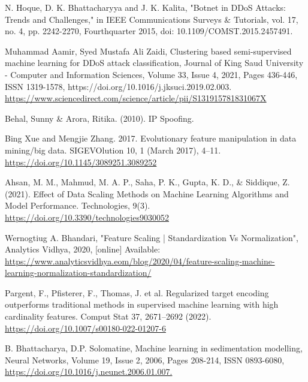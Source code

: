 \documentclass[runningheads]{llncs}
\begin{document}
\begin{thebibliography}{8}

N. Hoque, D. K. Bhattacharyya and J. K. Kalita, "Botnet in DDoS Attacks: Trends and Challenges," 
in IEEE Communications Surveys \& Tutorials, vol. 17, no. 4, pp. 2242-2270, Fourthquarter 2015, 
doi: 10.1109/COMST.2015.2457491.


Muhammad Aamir, Syed Mustafa Ali Zaidi,
Clustering based semi-supervised machine learning for DDoS attack classification,
Journal of King Saud University - Computer and Information Sciences,
Volume 33, Issue 4,
2021,
Pages 436-446,
ISSN 1319-1578,
https://doi.org/10.1016/j.jksuci.2019.02.003.
\url{https://www.sciencedirect.com/science/article/pii/S131915781831067X}

Behal, Sunny \& Arora, Ritika. (2010). IP Spoofing.

Bing Xue and Mengjie Zhang. 2017. Evolutionary feature manipulation in data mining/big data. SIGEVOlution 10, 1 (March 2017), 4–11. \url{https://doi.org/10.1145/3089251.3089252}

Ahsan, M. M., Mahmud, M. A. P., Saha, P. K., Gupta, K. D., \& Siddique, Z. (2021). Effect of Data Scaling Methods on Machine Learning Algorithms and Model Performance. Technologies, 9(3). \url{https://doi.org/10.3390/technologies9030052}

Wernogtiug A. Bhandari, "Feature Scaling | Standardization Vs Normalization", Analytics Vidhya, 2020, [online] Available: \url{https://www.analyticsvidhya.eom/blog/2020/04/feature-scaling-machine-learning-normalization-standardization/}

Pargent, F., Pfisterer, F., Thomas, J. et al. Regularized target encoding outperforms traditional methods in supervised machine learning with high cardinality features. Comput Stat 37, 2671–2692 (2022). \url{https://doi.org/10.1007/s00180-022-01207-6}

B. Bhattacharya, D.P. Solomatine, Machine learning in sedimentation modelling, Neural Networks, Volume 19, Issue 2, 2006, Pages 208-214, ISSN 0893-6080, \url{https://doi.org/10.1016/j.neunet.2006.01.007.}


\end{thebibliography}
\end{document}
